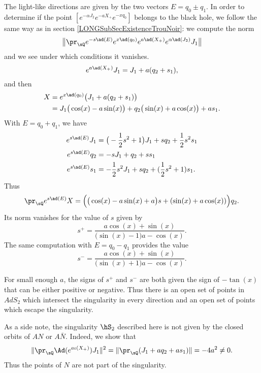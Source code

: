 The light-like directions are given by the two vectors $E=q_0\pm q_1$. In order to determine if the point $[e^{-\alpha J_2}e^{-aX_+} e^{-xq_0}]$ belongs to the black hole, we follow the same way as in section \ref{LONGSubSecExistenceTrouNoir}: we compute the norm
\begin{equation}
	\big\| \pr_{\sQ}  e^{-s\ad(E)}e^{x\ad(q_0)} e^{a\ad(X_+)} e^{\alpha\ad(J_2)}J_1 \big\|
\end{equation}
and we see under which conditions it vanishes. 
%
\begin{equation}
	e^{a\ad(X_+)}J_1=J_1+a(q_2+s_1),
\end{equation}
and then
\begin{equation}
	\begin{aligned}[]
		X&= e^{x\ad(q_0)}\big( J_1+a(q_2+s_1) \big)\\
		&=J_1\big( \cos(x)-a\sin(x) \big)+q_2\big( \sin(x)+a\cos(x) \big)+as_1.
	\end{aligned}
\end{equation}
With $E=q_0+q_1$, we have
\begin{equation}
	\begin{aligned}[]
		e^{s\ad(E)}J_1&=\big( -\frac{ 1 }{2}s^2+1 \big)J_1+sq_2+\frac{ 1 }{2}s^2s_1\\
		e^{s\ad(E)}q_2&=-sJ_1+q_2+ss_1\\
		e^{s\ad(E)}s_1&=-\frac{ 1 }{2}s^2J_1+sq_2+(\frac{ 1 }{2}s^2+1)s_1.
	\end{aligned}
\end{equation}
Thus
\begin{equation}
	\pr_{\sQ} e^{s\ad(E)}X=\Big( \big( \cos(x)-a\sin(x)+a \big)s+(\sin(x)+a\cos(x)) \Big)q_2.
\end{equation}
Its norm vanishes for the value of $s$ given by
\begin{equation}
	s^+=\frac{ a\cos(x)+\sin(x) }{ \big( \sin(x)-1 \big)a-\cos(x) }.
\end{equation}
The same computation with $E=q_0-q_1$ provides the value
\begin{equation}
	s^-=\frac{ a\cos(x)+\sin(x) }{ \big( \sin(x)+1 \big)a-\cos(x) }.
\end{equation}

For small enough $a$, the signs of $s^+$ and $s^-$ are both given the sign of $-\tan(x)$ that can be either positive or negative. Thus there is an open set of points in $AdS_2$ which intersect the singularity in every direction and an open set of points which escape the singularity.

As a side note, the singularity $\hS_2$ described here is not given by the closed orbits of $AN$ or $A\bar N$. Indeed, we show that
\begin{equation}
	\| \pr_{\sQ}\Ad( e^{a\iota(X_+)})J_1 \|^2=\| \pr_{\sQ}(J_1+aq_2+as_1) \|=-4a^2\neq 0.
\end{equation}
Thus the points of $N$ are not part of the singularity.
